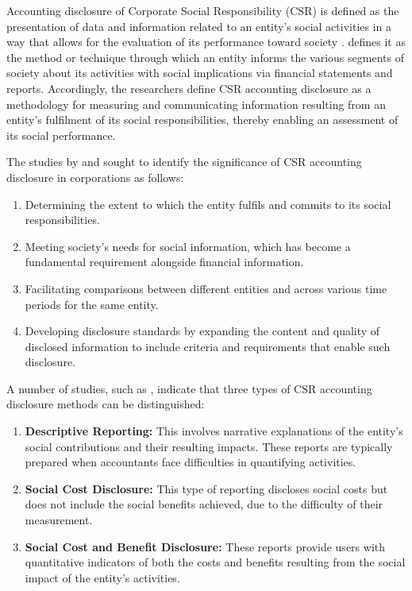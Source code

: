 \documentclass[10pt]{NSP1}
\begin{document}
Accounting disclosure of Corporate Social Responsibility (CSR) is defined as the presentation of data and information related to an entity's social activities in a way that allows for the evaluation of its performance toward society \cite{Laila2022}. \cite{Qassoum2018} defines it as the method or technique through which an entity informs the various segments of society about its activities with social implications via financial statements and reports. Accordingly, the researchers define CSR accounting disclosure as a methodology for measuring and communicating information resulting from an entity's fulfilment of its social responsibilities, thereby enabling an assessment of its social performance.

The studies by \cite{AbuStala2022} and \cite{Nabou2021} sought to identify the significance of CSR accounting disclosure in corporations as follows:

\begin{enumerate}
    \item Determining the extent to which the entity fulfils and commits to its social responsibilities.
    \item Meeting society's needs for social information, which has become a fundamental requirement alongside financial information.
    \item Facilitating comparisons between different entities and across various time periods for the same entity.
    \item Developing disclosure standards by expanding the content and quality of disclosed information to include criteria and requirements that enable such disclosure.
\end{enumerate}

A number of studies, such as \cite{Tarshi2017}, indicate that three types of CSR accounting disclosure methods can be distinguished:

\begin{enumerate}
    \item \textbf{Descriptive Reporting:} This involves narrative explanations of the entity's social contributions and their resulting impacts. These reports are typically prepared when accountants face difficulties in quantifying activities.
    \item \textbf{Social Cost Disclosure:} This type of reporting discloses social costs but does not include the social benefits achieved, due to the difficulty of their measurement.
    \item \textbf{Social Cost and Benefit Disclosure:} These reports provide users with quantitative indicators of both the costs and benefits resulting from the social impact of the entity's activities.
\end{enumerate}
\end{document}
